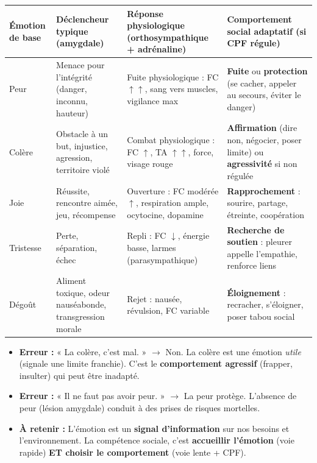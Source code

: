 \documentclass[11pt]{article}
\newcommand{\cle}[1]{{\popxbold\color{popdark}#1}}
\begin{document}
\begin{center}
\begin{tabularx}{\linewidth}{|l|X|X|X|}
\hline
\rowcolor{popblueL}
\textbf{Émotion de base} & \textbf{Déclencheur typique (amygdale)} & \textbf{Réponse physiologique (orthosympathique + adrénaline)} & \textbf{Comportement social adaptatif (si CPF régule)} \\
\hline
\cle{Peur} & Menace pour l'intégrité (danger, inconnu, hauteur) & Fuite physiologique : FC $\uparrow\uparrow$, sang vers muscles, vigilance max & \textbf{Fuite} ou \textbf{protection} (se cacher, appeler au secours, éviter le danger) \\
\hline
\cle{Colère} & Obstacle à un but, injustice, agression, territoire violé & Combat physiologique : FC $\uparrow$, TA $\uparrow\uparrow$, force, visage rouge & \textbf{Affirmation} (dire non, négocier, poser limite) ou \textbf{agressivité} si non régulée \\
\hline
\cle{Joie} & Réussite, rencontre aimée, jeu, récompense & Ouverture : FC modérée $\uparrow$, respiration ample, ocytocine, dopamine & \textbf{Rapprochement} : sourire, partage, étreinte, coopération \\
\hline
\cle{Tristesse} & Perte, séparation, échec & Repli : FC $\downarrow$, énergie basse, larmes (parasympathique) & \textbf{Recherche de soutien} : pleurer appelle l'empathie, renforce liens \\
\hline
\cle{Dégoût} & Aliment toxique, odeur nauséabonde, transgression morale & Rejet : nausée, révulsion, FC variable & \textbf{Éloignement} : recracher, s'éloigner, poser tabou social \\
\hline
\end{tabularx}
\end{center}

\begin{attention}
\begin{itemize}
  \item \textbf{Erreur :} « La colère, c'est mal. » $\rightarrow$ Non. La colère est une émotion \emph{utile} (signale une limite franchie). C'est le \textbf{comportement agressif} (frapper, insulter) qui peut être inadapté.
  \item \textbf{Erreur :} « Il ne faut pas avoir peur. » $\rightarrow$ La peur protège. L'absence de peur (lésion amygdale) conduit à des prises de risques mortelles.
  \item \textbf{À retenir :} L'émotion est un \textbf{signal d'information} sur nos besoins et l'environnement. La compétence sociale, c'est \textbf{accueillir l'émotion} (voie rapide) \textbf{ET choisir le comportement} (voie lente + CPF).
\end{itemize}
\end{attention}
\end{document}

